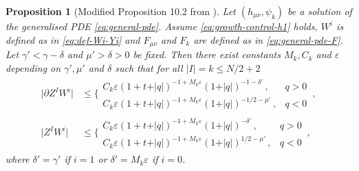\documentclass[11pt, a4paper]{amsart}
\numberwithin{equation}{section}
\newtheorem{proposition}[theorem]{Proposition}
\numberwithin{theorem}{section}
\newcommand{\p}{\partial}
\newcommand{\mn}{{\mu \nu}}
\newcommand{\qv}{\vert q \vert}
\newcommand{\I}{\vert I \vert}
\begin{document}
\begin{proposition}[Modified Proposition 10.2 from \cite{LR:04}] \label{prop-10.2} Let $(h_\mn, \psi_k)$ be a solution of the generalised PDE \eqref{eq:general-pde}. 
Assume \eqref{eq:growth-control-h1} holds, $W^i$ is defined as in \eqref{eq:def-Wi-Yi} and $F_\mn$ and $F_k$ are defined as in \eqref{eq:general-pde-F}. 
Let $\gamma' < \gamma - \delta$ and $\mu' > \delta>0$ be fixed. Then there exist constants $M_k, C_k$ and $\varepsilon$ depending on $\gamma', \mu'$ and $\delta$ such that for all $\I = k \leq N/2 + 2$
\begin{align*}
\vert \p Z^I W^i \vert& \leq \Bigg\lbrace \begin{array}{ll} C_k \varepsilon (1+t+\qv)^{-1 + M_k \varepsilon}(1+\qv)^{-1-\delta'}  \,, & q >0 \\
C_k \varepsilon (1+t+\qv)^{-1 + M_k \varepsilon}(1+\qv)^{-1/2-\mu'}  \,, & q <0 
\end{array} \,, \\
\vert Z^I W^i \vert & \leq \Bigg\lbrace \begin{array}{ll} C_k \varepsilon (1+t+\qv)^{-1 + M_k \varepsilon}(1+\qv)^{-\delta'}   \,, & q >0 \\
C_k \varepsilon (1+t+\qv)^{-1 + M_k \varepsilon}(1+\qv)^{1/2-\mu'} \,, & q<0 
\end{array}  \,,
\end{align*}
where $\delta'=\gamma'$ if $i=1$ or $\delta'=M_k \varepsilon$ if $i=0$. 
\end{proposition}
\end{document}
